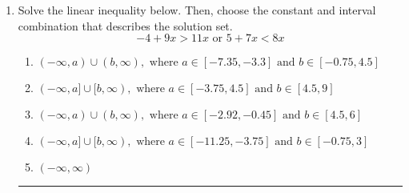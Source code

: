 \documentclass[14pt]{extbook}
\newcommand{\litem}[1]{\item#1\hspace*{-1cm}\rule{\textwidth}{0.4pt}}
\begin{document}
\begin{enumerate}
{\begin{enumerate}[label=\Alph*.]
\end{enumerate} }
\litem{
Solve the linear inequality below. Then, choose the constant and interval combination that describes the solution set.\[ -4 + 9 x > 11 x \text{ or } 5 + 7 x < 8 x \]\begin{enumerate}[label=\Alph*.]
\item \( (-\infty, a) \cup (b, \infty), \text{ where } a \in [-7.35, -3.3] \text{ and } b \in [-0.75, 4.5] \)
\item \( (-\infty, a] \cup [b, \infty), \text{ where } a \in [-3.75, 4.5] \text{ and } b \in [4.5, 9] \)
\item \( (-\infty, a) \cup (b, \infty), \text{ where } a \in [-2.92, -0.45] \text{ and } b \in [4.5, 6] \)
\item \( (-\infty, a] \cup [b, \infty), \text{ where } a \in [-11.25, -3.75] \text{ and } b \in [-0.75, 3] \)
\item \( (-\infty, \infty) \)

\end{enumerate} }
\end{enumerate}
\end{document}
